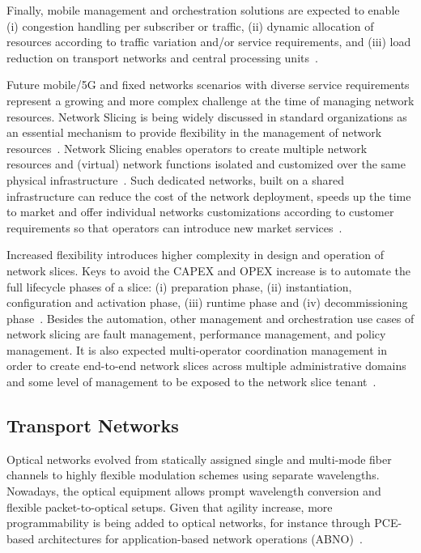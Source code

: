 Finally, mobile management and orchestration solutions are expected to enable (i) congestion handling per subscriber or traffic, (ii) dynamic allocation of resources according to traffic variation and/or service requirements, and (iii) load reduction on transport networks and central processing units~\cite{EricssonInc.2015}. 

Future mobile/5G and fixed networks scenarios with diverse service requirements represent a growing and more complex challenge at the time of managing network resources. Network Slicing is being widely discussed in standard organizations as an essential mechanism to provide flexibility in the management of network resources~\cite{NGMN:5G:2017}. Network Slicing enables operators to create multiple network resources and (virtual) network functions isolated and customized over the same physical infrastructure~\cite{Galis:2018}. Such dedicated networks, built on a shared infrastructure can reduce the cost of the network deployment, speeds up the time to market and offer individual networks customizations according to customer requirements so that operators can introduce new market services~\cite{Devlic2017NESMO:Framework}. 

Increased flexibility introduces higher complexity in design and operation of network slices. Keys to avoid the CAPEX and OPEX increase is to automate the full lifecycle phases of a slice: (i) preparation phase, (ii) instantiation, configuration and activation phase, (iii) runtime phase and (iv) decommissioning phase~\cite{3GPP:TR28801:2017}. Besides the automation, other management and orchestration use cases of network slicing are fault management, performance management, and policy management. It is also expected multi-operator coordination management in order to create end-to-end network slices across multiple administrative domains and some level of management to be exposed to the network slice tenant~\cite{Contreras:2018}.

\subsection{Transport Networks}
Optical networks evolved from statically assigned single and multi-mode fiber channels to highly flexible modulation schemes using separate wavelengths. Nowadays, the optical equipment allows prompt wavelength conversion and flexible packet-to-optical setups. Given that agility increase, more programmability is being added to optical networks, for instance through PCE-based architectures for application-based network operations (ABNO)~\cite{RFC7491}. 

